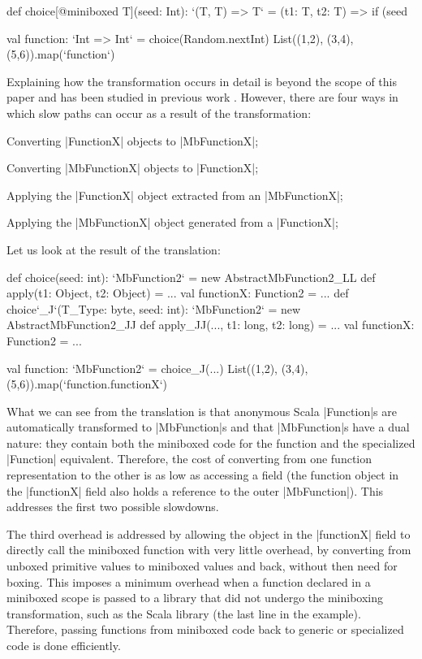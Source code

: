 \begin{lstlisting-nobreak}
 def choice[@miniboxed T](seed: Int): `(T, T) => T` =
   (t1: T, t2: T) => if (seed %

 val function: `Int => Int` = choice(Random.nextInt)
 List((1,2), (3,4), (5,6)).map(`function`)
\end{lstlisting-nobreak}

Explaining how the transformation occurs in detail is beyond the scope of this paper and has been studied in previous work \cite{ldl,ildl-tech}. However, there are four ways in which slow paths can occur as a result of the transformation:
\begin{compactitem}
  \item Converting |FunctionX| objects to |MbFunctionX|;
  \item Converting |MbFunctionX| objects to |FunctionX|;
  \item Applying the |FunctionX| object extracted from an |MbFunctionX|;
  \item Applying the |MbFunctionX| object generated from a |FunctionX|;
\end{compactitem}

Let us look at the result of the translation:

\begin{lstlisting-nobreak}
 def choice(seed: int): `MbFunction2` =
   new AbstractMbFunction2_LL {
     def apply(t1: Object, t2: Object) = ...
     val functionX: Function2 = ...
   }
 def choice`_J`(T_Type: byte, seed: int): `MbFunction2` =
   new AbstractMbFunction2_JJ {
     def apply_JJ(..., t1: long, t2: long) = ...
     val functionX: Function2 = ...
   }

 val function: `MbFunction2` = choice_J(...)
 List((1,2), (3,4), (5,6)).map(`function.functionX`)
\end{lstlisting-nobreak}

What we can see from the translation is that anonymous Scala |Function|s are automatically transformed to |MbFunction|s and that |MbFunction|s have a dual nature: they contain both the miniboxed code for the function and the specialized |Function| equivalent. Therefore, the cost of converting from one function representation to the other is as low as accessing a field (the function object in the |functionX| field also holds a reference to the outer |MbFunction|). This addresses the first two possible slowdowns.

The third overhead is addressed by allowing the object in the |functionX| field to directly call the miniboxed function with very little overhead, by converting from unboxed primitive values to miniboxed values and back, without then need for boxing. This imposes a minimum overhead when a function declared in a miniboxed scope is passed to a library that did not undergo the miniboxing transformation, such as the Scala library (the last line in the example). Therefore, passing functions from miniboxed code back to generic or specialized code is done efficiently.

